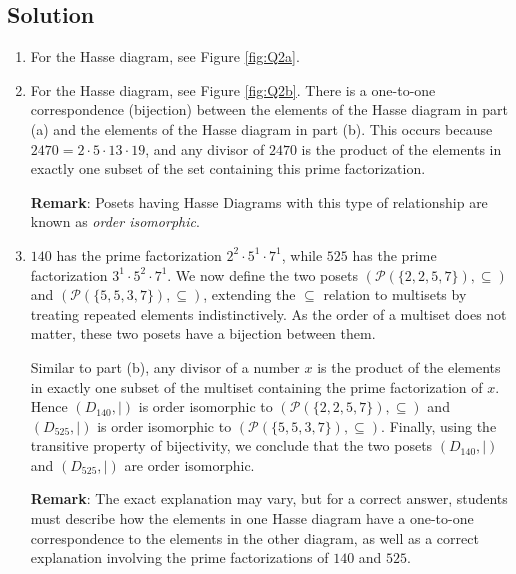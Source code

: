 \documentclass{article}
\begin{document}
\subsection*{Solution}
    \begin{enumerate}
        \item For the Hasse diagram, see Figure \ref{fig:Q2a}.
        \item For the Hasse diagram, see Figure \ref{fig:Q2b}. There is a one-to-one correspondence (bijection) between the elements of the Hasse diagram in part (a) and the elements of the Hasse diagram in part (b). This occurs because $2470 = 2 \cdot 5 \cdot 13 \cdot 19$, and any divisor of $2470$ is the product of the elements in exactly one subset of the set containing this prime factorization.
        
        \vspace{1.5mm}
        \textbf{Remark}: Posets having Hasse Diagrams with this type of relationship are known as \textit{order isomorphic}.
        \item $140$ has the prime factorization $2^{2} \cdot 5^{1} \cdot 7^{1}$, while $525$ has the prime factorization $3^{1} \cdot 5^{2} \cdot 7^{1}$. We now define the two posets $(\mathcal{P}(\{2, 2, 5, 7\}), \subseteq)$ and $(\mathcal{P}(\{5, 5, 3, 7\}), \subseteq)$, extending the $\subseteq$ relation to multisets by treating repeated elements indistinctively. As the order of a multiset does not matter, these two posets have a bijection between them.
        
        \vspace{1.5mm}
        Similar to part (b), any divisor of a number $x$ is the product of the elements in exactly one subset of the multiset containing the prime factorization of $x$. Hence $(D_{140}, \mid)$ is order isomorphic to $(\mathcal{P}(\{2, 2, 5, 7\}), \subseteq)$ and $(D_{525}, \mid)$ is order isomorphic to $(\mathcal{P}(\{5, 5, 3, 7\}), \subseteq)$. Finally, using the transitive property of bijectivity, we conclude that the two posets $(D_{140}, \mid)$ and $(D_{525}, \mid)$ are order isomorphic.
        
        \vspace{1.5mm}
        \textbf{Remark}: The exact explanation may vary, but for a correct answer, students must describe how the elements in one Hasse diagram have a one-to-one correspondence to the elements in the other diagram, as well as a correct explanation involving the prime factorizations of $140$ and $525$.
    \end{enumerate}
    
\end{document}

